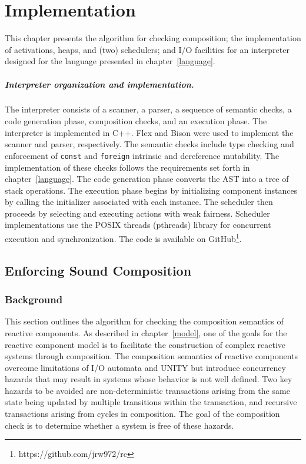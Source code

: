 \chapter{Implementation \label{implementation}}

This chapter presents the algorithm for checking composition; the implementation of activations, heaps, and (two) schedulers; and I/O facilities for an interpreter designed for the language presented in chapter~\ref{language}.

\paragraph{Interpreter organization and implementation.}
The interpreter consists of a scanner, a parser, a sequence of semantic checks, a code generation phase, composition checks, and an execution phase.
The interpreter is implemented in C++.
Flex and Bison were used to implement the scanner and parser, respectively.
The semantic checks include type checking and enforcement of \verb+const+ and \verb+foreign+ intrinsic and dereference mutability.
The implementation of these checks follows the requirements set forth in chapter~\ref{language}.
The code generation phase converts the AST into a tree of stack operations.
The execution phase begins by initializing component instances by calling the initializer associated with each instance.
The scheduler then proceeds by selecting and executing actions with weak fairness.
Scheduler implementations use the POSIX threads (pthreads) library for concurrent execution and synchronization.
The code is available on GitHub\footnote{https://github.com/jrw972/rc}.

\section{Enforcing Sound Composition}

\subsection{Background}

This section outlines the algorithm for checking the composition semantics of reactive components.
As described in chapter~\ref{model}, one of the goals for the reactive component model is to facilitate the construction of complex reactive systems through composition.
The composition semantics of reactive components overcome limitations of I/O automata and UNITY but introduce concurrency hazards that may result in systems whose behavior is not well defined.
Two key hazards to be avoided are non-deterministic transactions arising from the same state being updated by multiple transitions within the transaction, and recursive transactions arising from cycles in composition.
The goal of the composition check is to determine whether a system is free of these hazards.

